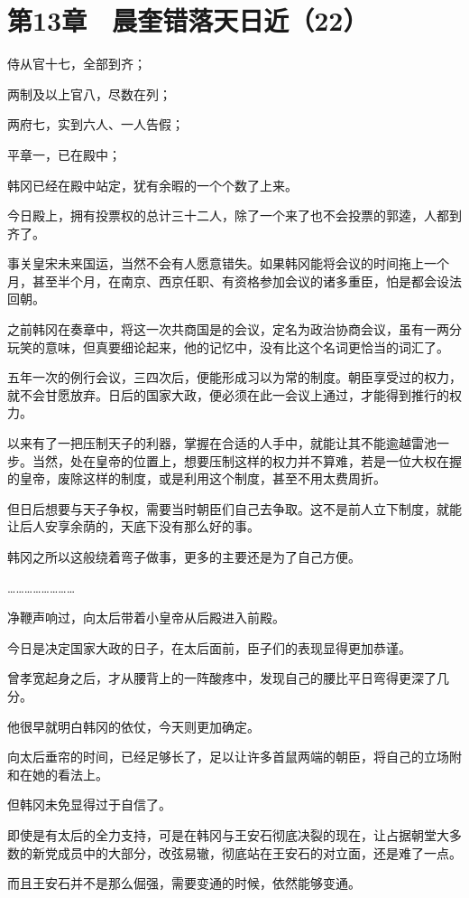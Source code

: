 \section{第13章　晨奎错落天日近（22）}

侍从官十七，全部到齐；

两制及以上官八，尽数在列；

两府七，实到六人、一人告假；

平章一，已在殿中；

韩冈已经在殿中站定，犹有余暇的一个个数了上来。

今日殿上，拥有投票权的总计三十二人，除了一个来了也不会投票的郭逵，人都到齐了。

事关皇宋未来国运，当然不会有人愿意错失。如果韩冈能将会议的时间拖上一个月，甚至半个月，在南京、西京任职、有资格参加会议的诸多重臣，怕是都会设法回朝。

之前韩冈在奏章中，将这一次共商国是的会议，定名为政治协商会议，虽有一两分玩笑的意味，但真要细论起来，他的记忆中，没有比这个名词更恰当的词汇了。

五年一次的例行会议，三四次后，便能形成习以为常的制度。朝臣享受过的权力，就不会甘愿放弃。日后的国家大政，便必须在此一会议上通过，才能得到推行的权力。

以来有了一把压制天子的利器，掌握在合适的人手中，就能让其不能逾越雷池一步。当然，处在皇帝的位置上，想要压制这样的权力并不算难，若是一位大权在握的皇帝，废除这样的制度，或是利用这个制度，甚至不用太费周折。

但日后想要与天子争权，需要当时朝臣们自己去争取。这不是前人立下制度，就能让后人安享余荫的，天底下没有那么好的事。

韩冈之所以这般绕着弯子做事，更多的主要还是为了自己方便。

……………………

净鞭声响过，向太后带着小皇帝从后殿进入前殿。

今日是决定国家大政的日子，在太后面前，臣子们的表现显得更加恭谨。

曾孝宽起身之后，才从腰背上的一阵酸疼中，发现自己的腰比平日弯得更深了几分。

他很早就明白韩冈的依仗，今天则更加确定。

向太后垂帘的时间，已经足够长了，足以让许多首鼠两端的朝臣，将自己的立场附和在她的看法上。

但韩冈未免显得过于自信了。

即使是有太后的全力支持，可是在韩冈与王安石彻底决裂的现在，让占据朝堂大多数的新党成员中的大部分，改弦易辙，彻底站在王安石的对立面，还是难了一点。

而且王安石并不是那么倔强，需要变通的时候，依然能够变通。

